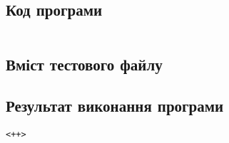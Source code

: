 \subsection*{Код програми}

\inputminted{c++}{<++>}

\subsection*{Вміст тестового файлу}



\subsection*{Результат виконання програми}



\begin{verbatim}
<++>
\end{verbatim}
